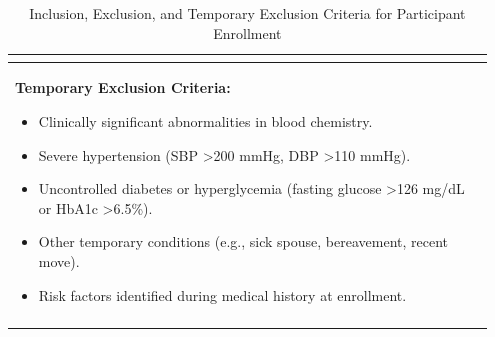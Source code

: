 \documentclass[a4paper,fleqn]{cas-sc}
\begin{document}
\begin{longtable}{|p{0.95\linewidth}|}
\begin{itemize}
\begin{itemize}
        \end{itemize}
\end{itemize} \\ 
\hline
\textbf{Temporary Exclusion Criteria:}
\begin{itemize}
    \item Clinically significant abnormalities in blood chemistry.
    \item Severe hypertension (SBP >200 mmHg, DBP >110 mmHg).
    \item Uncontrolled diabetes or hyperglycemia (fasting glucose >126 mg/dL or HbA1c >6.5\%).
    \item Other temporary conditions (e.g., sick spouse, bereavement, recent move).
    \item Risk factors identified during medical history at enrollment.
\end{itemize} \\
\hline
\caption{Inclusion, Exclusion, and Temporary Exclusion Criteria for Participant Enrollment}
\label{tab:criteria}
\end{longtable}
\end{document}
